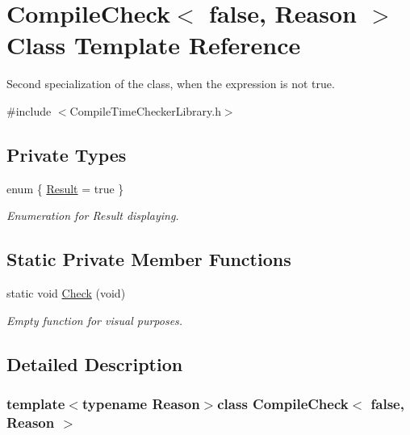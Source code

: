 \hypertarget{class_compile_check_3_01false_00_01_reason_01_4}{\section{Compile\-Check$<$ false, Reason $>$ Class Template Reference}
\label{class_compile_check_3_01false_00_01_reason_01_4}
}


Second specialization of the class, when the expression is not true.  




{\ttfamily \#include $<$Compile\-Time\-Checker\-Library.\-h$>$}

\subsection*{Private Types}
\begin{DoxyCompactItemize}
\item 
enum \{ \hyperlink{class_compile_check_3_01false_00_01_reason_01_4_a7777002f83cd288663fad3eba2721a9ba9f7df94908ad6f5f6296d4bb2e8e0e3f}{Result} = true
 \}
\begin{DoxyCompactList}\small\item\em Enumeration for Result displaying. \end{DoxyCompactList}\end{DoxyCompactItemize}
\subsection*{Static Private Member Functions}
\begin{DoxyCompactItemize}
\item 
static void \hyperlink{class_compile_check_3_01false_00_01_reason_01_4_a1da45a656d0ba16e65e757aa3492c1da}{Check} (void)
\begin{DoxyCompactList}\small\item\em Empty function for visual purposes. \end{DoxyCompactList}\end{DoxyCompactItemize}


\subsection{Detailed Description}
\subsubsection*{template$<$typename Reason$>$class Compile\-Check$<$ false, Reason $>$}

